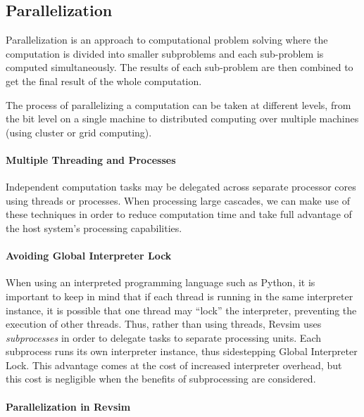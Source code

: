 \subsection{Parallelization}
Parallelization is an approach to computational problem solving where the computation is divided into smaller subproblems and each sub-problem is computed simultaneously. The results of each sub-problem are then combined to get the final result of the whole computation.

The process of parallelizing a computation can be taken at different levels, from the bit level on a single machine to distributed computing over multiple machines (using cluster or grid computing).

\paragraph{Multiple Threading and Processes} Independent computation tasks may be delegated across separate processor cores using threads or processes. When processing large cascades, we can make use of these techniques in order to reduce computation time and take full advantage of the host system's processing capabilities.

\paragraph{Avoiding Global Interpreter Lock} When using an interpreted programming language such as Python, it is important to keep in mind that if each thread is running in the same interpreter instance, it is possible that one thread may ``lock'' the interpreter, preventing the execution of other threads. Thus, rather than using threads, Revsim uses \emph{subprocesses} in order to delegate tasks to separate processing units. Each subprocess runs its own interpreter instance, thus sidestepping Global Interpreter Lock. This advantage comes at the cost of increased interpreter overhead, but this cost is negligible when the benefits of subprocessing are considered. 

\paragraph{Parallelization in Revsim} 

